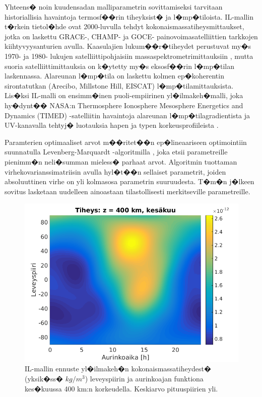 \documentclass[12pt,a4paper,finnish,margin=2in]{article}
\begin{document}
Yhteens� noin kuudensadan malliparametrin sovittamiseksi tarvitaan historiallisia havaintoja termosf��rin tiheyksist� ja l�mp�tiloista. IL-mallin t�rkein tietol�hde ovat 2000-luvulla tehdyt kokonaismassatiheysmittaukset, jotka on laskettu GRACE-, CHAMP- \citep[esim.][]{bruinsma_2006} ja GOCE- \citep{bruinsma_2014} painovoimasatelliittien tarkkojen kiihtyvyysanturien avulla. Kaasulajien lukum��r�tiheydet perustuvat my�s 1970- ja 1980- lukujen satelliittipohjaisiin massaspektrometrimittauksiin \citep[esim.][]{hedin_1974}, mutta suoria satelliittimittauksia on k�ytetty my�s eksosf��rin l�mp�tilan laskennassa. Alareunan l�mp�tila on laskettu kolmen ep�koherentin sirontatutkan (Arecibo, Millstone Hill, EISCAT) l�mp�tilamittauksista. Lis�ksi IL-malli on ensimm�inen puoli-empiirinen yl�ilmakeh�malli, joka hy�dynt�� NASA:n Thermosphere Ionosphere Mesosphere Energetics and Dynamics (TIMED) -satelliitin havaintoja alareunan l�mp�tilagradientista \citep{zhang_2006} ja UV-kanavalla tehtyj� luotauksia hapen ja typen korkeusprofiileista \citep{meier_2015}. 

Paramterien optimaaliset arvot m��ritet��n ep�lineaariseen optimointiin suunnatulla Levenberg-Marquardt -algoritmilla \citep[esim.][]{more_1978}, joka etsii parametreille pienimm�n neli�summan mieless� parhaat arvot. Algoritmin tuottaman virhekovarianssimatriisin avulla hyl�t��n sellaiset parametrit, joiden absoluuttinen virhe on yli kolmasosa parametrin suuruudesta. T�m�n j�lkeen sovitus lasketaan uudelleen ainoastaan tilastollisesti merkitseville parametreille. 

\begin{figure}[t]
\includegraphics[scale = 0.65]{gradu_tiheys}
\caption{IL-mallin ennuste yl�ilmakeh�n kokonaismassatiheydest� (yksik�ss� $kg/m^3$) leveyspiirin ja aurinkoajan funktiona kes�kuussa 400 km:n korkeudella. Keskiarvo pituuspiirien yli.}
\label{fig:tiheys}
\end{figure}
\end{document}
